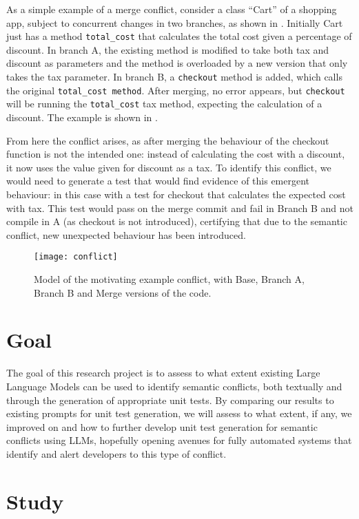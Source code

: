 As a simple example of a merge conflict, consider a class ``Cart'' of a shopping app, subject to concurrent changes in two branches, as shown in .
Initially Cart just has a method \texttt{total\_cost} that calculates the total cost given a percentage of discount.
In branch A, the existing method is modified to take both tax and discount as parameters and the method is overloaded by a new version that only takes the tax parameter.
In branch B, a \texttt{checkout} method is added, which calls the original \texttt{total\_cost method}. After merging, no error appears, but \texttt{checkout} will be running the \texttt{total\_cost} tax method, expecting the calculation of a discount. The example is shown in .

From here the conflict arises, as after merging the behaviour of the checkout function is not the intended one: instead of calculating the cost with a discount, it now uses the value given for discount as a tax.
To identify this conflict, we would need to generate a test that would find evidence of this emergent behaviour: in this case with a test for checkout that calculates the expected cost with tax. This test would pass on the merge commit and fail in Branch B and not compile in A (as checkout is not introduced),
certifying that due to the semantic conflict, new unexpected behaviour has been introduced.

\begin{figure}[t]
    \texttt{[image: conflict]}
    \caption{Model of the motivating example conflict, with Base, Branch A, Branch B and Merge versions of the code.}
    \label{fig:conflict}
\end{figure}

\section{Goal} \label{sec:goal}

The goal of this research project is to assess to what extent existing Large Language Models can be used to identify semantic conflicts, both textually and through the generation
of appropriate unit tests. By comparing our results to existing prompts for unit test generation, we will assess to what extent, if any, we improved on and how to further develop
unit test generation for semantic conflicts using LLMs, hopefully opening avenues for fully automated systems that identify and alert developers to this type of conflict.

\section{Study} \label{sec:study}

